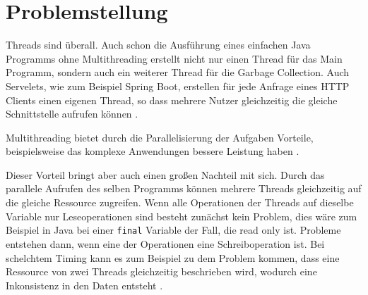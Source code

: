 \section{Problemstellung}

Threads sind überall. Auch schon die Ausführung eines einfachen Java Programms ohne Multithreading erstellt nicht nur einen Thread für das Main Programm, sondern auch ein weiterer Thread für die Garbage Collection. Auch Servelets, wie zum Beispiel Spring Boot, erstellen für jede Anfrage eines HTTP Clients einen eigenen Thread, so dass mehrere Nutzer gleichzeitig die gleiche Schnittstelle aufrufen können \cite[8]{brian}. 

Multithreading bietet durch die Parallelisierung der Aufgaben Vorteile, beispielsweise das komplexe Anwendungen bessere Leistung haben \cite[3]{brian}. 

Dieser Vorteil bringt aber auch einen großen Nachteil mit sich. Durch das parallele Aufrufen des selben Programms können mehrere Threads gleichzeitig auf die gleiche Ressource zugreifen. Wenn alle Operationen der Threads auf dieselbe Variable nur Leseoperationen sind besteht zunächst kein Problem, dies wäre zum Beispiel in Java  bei einer \texttt{final} Variable der Fall, die read only ist. Probleme entstehen dann, wenn eine der Operationen eine Schreiboperation ist. Bei schelchtem Timing kann es zum Beispiel zu dem Problem kommen, dass eine Ressource von zwei Threads gleichzeitig beschrieben wird, wodurch eine Inkonsistenz in den Daten entsteht \cite[vgl.][11-15]{brian}.      